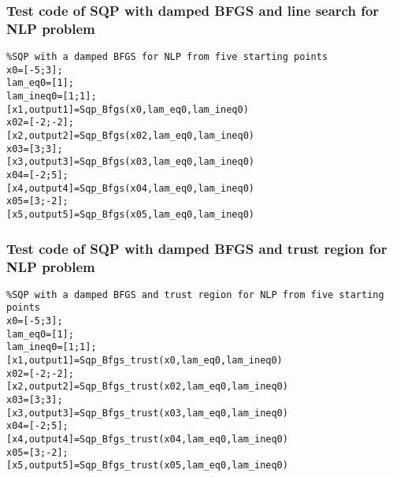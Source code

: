 
\subsubsection{\bfseries Test code of SQP with damped BFGS and line search for NLP problem}
\label{6.5.9}
{\setmainfont{Courier New Bold} \scriptsize         
\begin{lstlisting}
%SQP with a damped BFGS for NLP from five starting points
x0=[-5;3];
lam_eq0=[1];
lam_ineq0=[1;1];
[x1,output1]=Sqp_Bfgs(x0,lam_eq0,lam_ineq0)
x02=[-2;-2];
[x2,output2]=Sqp_Bfgs(x02,lam_eq0,lam_ineq0)
x03=[3;3];
[x3,output3]=Sqp_Bfgs(x03,lam_eq0,lam_ineq0)
x04=[-2;5];
[x4,output4]=Sqp_Bfgs(x04,lam_eq0,lam_ineq0)
x05=[3;-2];
[x5,output5]=Sqp_Bfgs(x05,lam_eq0,lam_ineq0)

\end{lstlisting}}


\subsubsection{\bfseries Test code of SQP with damped BFGS and trust region for NLP problem}
\label{6.5.10}
{\setmainfont{Courier New Bold} \scriptsize         
\begin{lstlisting}
%SQP with a damped BFGS and trust region for NLP from five starting points
x0=[-5;3];
lam_eq0=[1];
lam_ineq0=[1;1];
[x1,output1]=Sqp_Bfgs_trust(x0,lam_eq0,lam_ineq0)
x02=[-2;-2];
[x2,output2]=Sqp_Bfgs_trust(x02,lam_eq0,lam_ineq0)
x03=[3;3];
[x3,output3]=Sqp_Bfgs_trust(x03,lam_eq0,lam_ineq0)
x04=[-2;5];
[x4,output4]=Sqp_Bfgs_trust(x04,lam_eq0,lam_ineq0)
x05=[3;-2];
[x5,output5]=Sqp_Bfgs_trust(x05,lam_eq0,lam_ineq0)


\end{lstlisting}}

